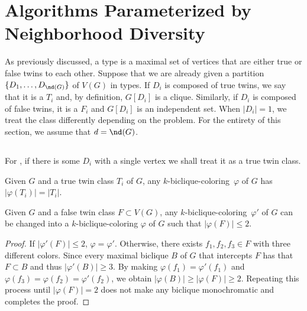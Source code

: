 \section{Algorithms Parameterized by Neighborhood Diversity}

As previously discussed, a type is a maximal set of vertices that are either true or false twins to each other.
Suppose that we are already given a partition $\{D_1, \dots, D_{\nd(G)}\}$ of $V(G)$ in types.
If $D_i$ is composed of true twins, we say that it is a  $T_i$ and, by definition, $G[D_i]$ is a clique.
Similarly, if $D_i$ is composed of false twins, it is a  $F_i$ and $G[D_i]$ is an independent set.
When $|D_i| = 1$, we treat the class differently depending on the problem.
For the entirety of this section, we assume that $d = \nd(G)$.

\subsection{}

For , if there is some $D_i$ with a single vertex we shall treat it as a true twin class.

\begin{observation}
    \label{obs:biclique_true_twins}
    Given $G$ and a true twin class $T_i$ of $G$, any $k$-biclique-coloring~$\varphi$ of $G$ has $|\varphi(T_i)| = |T_i|$.
\end{observation}

\begin{lemma}
    \label{lem:biclique_false_twins}
    Given $G$ and a false twin class $F \subset V(G)$, any  $k$-biclique-coloring~$\varphi'$ of $G$ can be changed into a $k$-biclique-coloring $\varphi$ of $G$ such that $|\varphi(F)| \leq 2$.
\end{lemma}

\begin{proof}
    If $|\varphi'(F)| \leq 2$, $\varphi = \varphi'$.
    Otherwise, there exists $f_1, f_2, f_3 \in F$ with three different colors. 
    Since every maximal biclique $B$ of $G$ that intercepts $F$ has that $F \subset B$ and thus $|\varphi'(B)| \geq 3$.
    By making $\varphi(f_1) = \varphi'(f_1)$ and $\varphi(f_3) = \varphi(f_2) = \varphi'(f_2)$, we obtain $|\varphi(B)| \geq |\varphi(F)| \geq 2$.
    Repeating this process until $|\varphi(F)| = 2$ does not make any biclique monochromatic and completes the proof.
\end{proof}

